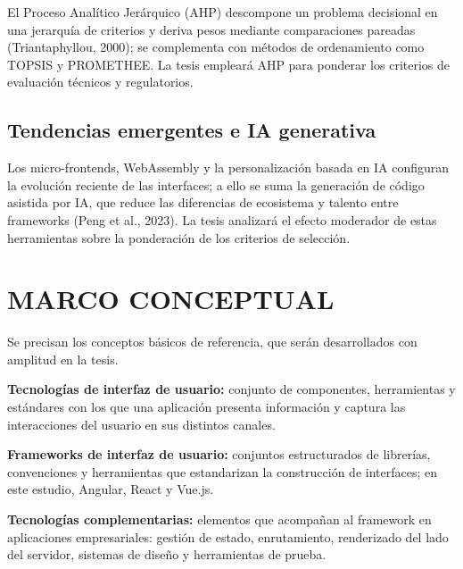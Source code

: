 El Proceso Analítico Jerárquico (AHP) descompone un problema decisional en una
jerarquía de criterios y deriva pesos mediante comparaciones pareadas
(Triantaphyllou, 2000); se complementa con métodos de ordenamiento como
TOPSIS y PROMETHEE. La tesis empleará AHP para ponderar los criterios de
evaluación técnicos y regulatorios.

\subsection{Tendencias emergentes e IA generativa}

Los micro-frontends, WebAssembly y la personalización basada en IA configuran
la evolución reciente de las interfaces; a ello se suma la generación de
código asistida por IA, que reduce las diferencias de ecosistema y talento
entre frameworks (Peng et al., 2023). La tesis analizará el efecto moderador
de estas herramientas sobre la ponderación de los criterios de selección.

\section{MARCO CONCEPTUAL}

Se precisan los conceptos básicos de referencia, que serán desarrollados con
amplitud en la tesis.

\textbf{Tecnologías de interfaz de usuario:} conjunto de componentes,
herramientas y estándares con los que una aplicación presenta información y
captura las interacciones del usuario en sus distintos canales.

\textbf{Frameworks de interfaz de usuario:} conjuntos estructurados de
librerías, convenciones y herramientas que estandarizan la construcción de
interfaces; en este estudio, Angular, React y Vue.js.

\textbf{Tecnologías complementarias:} elementos que acompañan al framework en
aplicaciones empresariales: gestión de estado, enrutamiento, renderizado del
lado del servidor, sistemas de diseño y herramientas de prueba.
